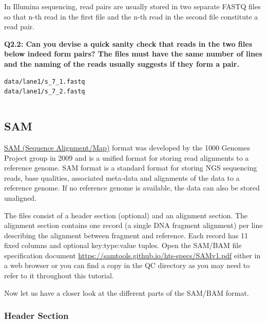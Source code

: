 \documentclass[11pt]{article}
\makeatletter
\newcommand{\boxspacing}{\kern\kvtcb@left@rule\kern\kvtcb@boxsep}
\newcommand{\prompt}[4]{
        \ttfamily\llap{{\color{#2}\LARGE\faKeyboardO\hspace{3pt}#4}}\vspace{-\baselineskip}
    }
\makeatother
\begin{document}
    In Illumina sequencing, read pairs are usually stored in two separate
FASTQ files so that n-th read in the first file and the n-th read in the
second file constitute a read pair.

\textbf{Q2.2: Can you devise a quick sanity check that reads in the two
files below indeed form pairs? The files must have the same number of
lines and the naming of the reads usually suggests if they form a pair.}

\begin{verbatim}
data/lane1/s_7_1.fastq
data/lane1/s_7_2.fastq
\end{verbatim}

    \begin{tcolorbox}[breakable, size=fbox, boxrule=1pt, pad at break*=1mm,colback=cellbackground, colframe=cellborder]
\prompt{In}{incolor}{ }{\boxspacing}
\begin{Verbatim}[commandchars=\\\{\}]

\end{Verbatim}
\end{tcolorbox}

    \hypertarget{sam}{%
\subsection{SAM}\label{sam}}

\href{https://samtools.github.io/hts-specs/SAMv1.pdf}{SAM (Sequence
Alignment/Map)} format was developed by the 1000 Genomes Project group
in 2009 and is a unified format for storing read alignments to a
reference genome. SAM format is a standard format for storing NGS
sequencing reads, base qualities, associated meta-data and alignments of
the data to a reference genome. If no reference genome is available, the
data can also be stored unaligned.

The files consist of a header section (optional) and an alignment
section. The alignment section contains one record (a single DNA
fragment alignment) per line describing the alignment between fragment
and reference. Each record has 11 fixed columns and optional
key:type:value tuples. Open the SAM/BAM file specification document
\url{https://samtools.github.io/hts-specs/SAMv1.pdf} either in a web
browser or you can find a copy in the QC directory as you may need to
refer to it throughout this tutorial.

Now let us have a closer look at the different parts of the SAM/BAM
format.

\hypertarget{header-section}{%
\subsubsection{Header Section}\label{header-section}}
\end{document}
